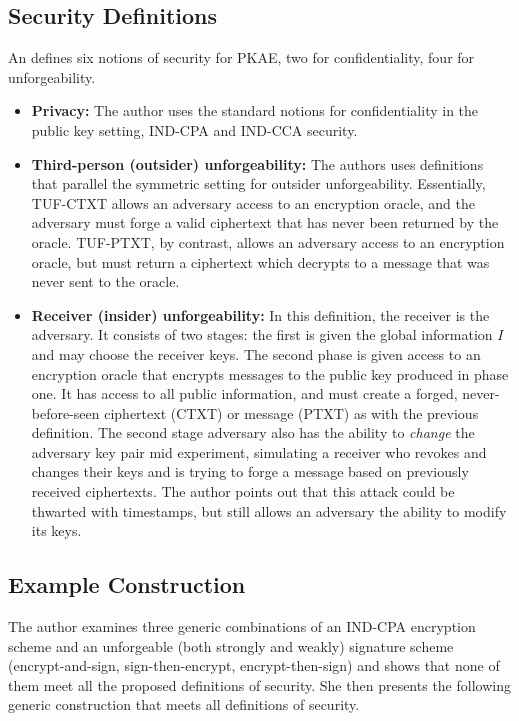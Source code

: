 \documentclass[11pt, pdftex]{article}
\begin{document}
\subsection{Security Definitions}
An defines six notions of security for PKAE, two for confidentiality, four for unforgeability.
\begin{itemize}
\item{\bf Privacy:} The author uses the standard notions for confidentiality in the public key setting, IND-CPA and IND-CCA security.
\item{\bf Third-person (outsider) unforgeability:} The authors uses definitions that parallel the symmetric setting for outsider unforgeability.
Essentially, TUF-CTXT allows an adversary access to an encryption oracle, and the adversary must forge a valid ciphertext that has never
been returned by the oracle.  TUF-PTXT, by contrast, allows an adversary access to an encryption oracle, but must return a ciphertext which
decrypts to a message that was never sent to the oracle.
\item{\bf Receiver (insider) unforgeability:} In this definition, the receiver is the adversary.  It consists of two stages: the first is given the global
information $I$ and may choose the receiver keys.  The second phase is given access to an encryption oracle that encrypts messages to the
public key produced in phase one.  It has access to all public information, and must create a forged, never-before-seen ciphertext (CTXT) or
message (PTXT) as with the previous definition.  The second stage adversary also has the ability to \emph{change} the adversary key pair mid
experiment, simulating a receiver who revokes and changes their keys and is trying to forge a message based on previously received ciphertexts.
The author points out that this attack could be thwarted with timestamps, but still allows an adversary the ability to modify its keys.
\end{itemize}

\subsection{Example Construction}
The author examines three generic combinations of an IND-CPA encryption scheme and an unforgeable (both strongly and weakly) signature scheme
 (encrypt-and-sign, sign-then-encrypt, encrypt-then-sign) and shows that none of them
meet all the proposed definitions of security.  She then presents the following generic construction that meets all definitions of security.
\end{document}
